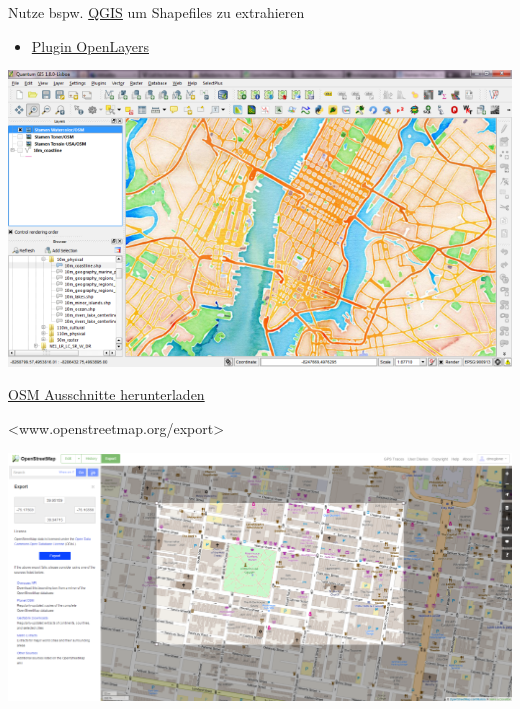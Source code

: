 \documentclass[ignorenonframetext,]{beamer}
\providecommand{\tightlist}{%
  \setlength{\itemsep}{0pt}\setlength{\parskip}{0pt}}
\begin{document}
\begin{frame}{Nutze bspw. \href{http://www.qgis.org/de/site/}{QGIS} um
Shapefiles zu extrahieren}

\begin{itemize}
\tightlist
\item
  \href{http://www.qgistutorials.com/de/docs/downloading_osm_data.html}{Plugin
  OpenLayers}
\end{itemize}

\includegraphics{figure/stamen_watercolor1.png}

\end{frame}

\begin{frame}{\href{http://www.openstreetmap.org/export}{OSM Ausschnitte
herunterladen}}

\textless{}www.openstreetmap.org/export\textgreater{}

\includegraphics{figure/openstreetmap_export-1024x505.png}

\end{frame}
\end{document}
